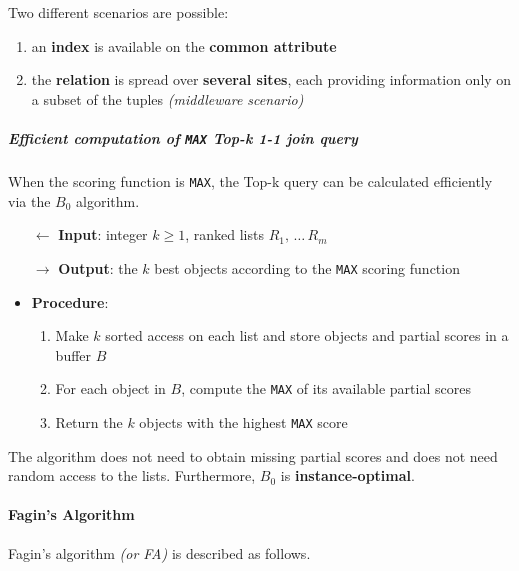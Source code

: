 \documentclass[english]{article}
\begin{document}
Two different scenarios are possible:

\begin{enumerate}
  \item an \textbf{index} is available on the \textbf{common attribute}
  \item the \textbf{relation} is spread over \textbf{several sites}, each providing information only on a subset of the tuples \textit{(middleware scenario)}
\end{enumerate}

\subparagraph*{Efficient computation of \texttt{MAX} Top-k 1-1 join query}
When the scoring function is \texttt{MAX}, the Top-k query can be calculated efficiently via the \(B_0\) algorithm.

\begin{itemize}
  \item[\(\leftarrow\)] \textbf{Input}: integer \(k \geq 1\), ranked lists \(R_1, \,\ldots\, R_m\)
  \item[\(\rightarrow\)] \textbf{Output}: the \(k\) best objects according to the \texttt{MAX} scoring function
  \item \textbf{Procedure}:
        \begin{enumerate}[label=step \arabic*., ref=step (\arabic*), widest*=7, leftmargin=*, labelindent=1em]
          \item Make \(k\) sorted access on each list and store objects and partial scores in a buffer \(B\)
          \item For each object in \(B\), compute the \texttt{MAX} of its available partial scores
          \item Return the \(k\) objects with the highest \texttt{MAX} score
        \end{enumerate}
\end{itemize}

The algorithm does not need to obtain missing partial scores and does not need random access to the lists.
Furthermore, \(B_0\) is \textbf{instance-optimal}.

\paragraph{Fagin's Algorithm}
Fagin's algorithm \textit{(or FA)} is described as follows.
\end{document}
